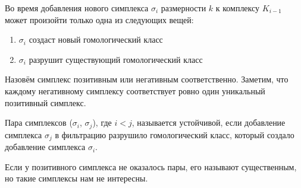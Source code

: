 \documentclass{article}
\begin{document}
Во время добавления нового симплекса $\sigma_i$ размерности $k$ к комплексу $K_{i-1}$ может произойти только одна из следующих вещей:
\begin{enumerate}
  \item $\sigma_i$ создаст новый гомологический класс
  \item $\sigma_i$ разрушит существующий гомологический класс
\end{enumerate}
Назовём симплекс позитивным или негативным соответственно. Заметим, что каждому негативному симплексу соответствует ровно один уникальный позитивный симплекс.
\begin{definition}
  Пара симплексов ($\sigma_i$, $\sigma_j$), где $i < j$, называется устойчивой, если добавление симплекса $\sigma_j$ в фильтрацию разрушило гомологический класс, который создало добавление симплекса $\sigma_i$.
\end{definition}
\begin{remark}
Если у позитивного симплекса не оказалось пары, его называют существенным, но такие симплексы нам не интересны.
\end{remark}
\end{document}
